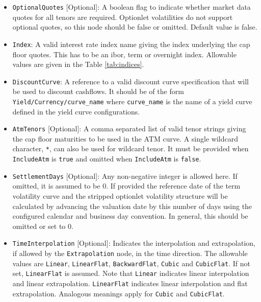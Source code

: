 \begin{itemize}
\item \lstinline!OptionalQuotes! [Optional]:
A boolean flag to indicate whether market data quotes for all tenors are required. Optionlet volatilities do not support optional quotes, so this node should be false or omitted. Default value is false.

\item \lstinline!Index!:
A valid interest rate index name giving the index underlying the cap floor quotes. This has to be an ibor, term or overnight index. Allowable values are given in the Table \ref{tab:indices}.

\item \lstinline!DiscountCurve!:
A reference to a valid discount curve specification that will be used to discount cashflows. It should be of the form \lstinline!Yield/Currency/curve_name! where \lstinline!curve_name! is the name of a yield curve defined in the yield curve configurations.

\item \lstinline!AtmTenors! [Optional]:
A comma separated list of valid tenor strings giving the cap floor maturities to be used in the ATM curve. A single wildcard character, \lstinline!*!, can also be used for wildcard tenor. It must be provided when \lstinline!IncludeAtm! is \lstinline!true! and omitted when \lstinline!IncludeAtm! is \lstinline!false!.

\item \lstinline!SettlementDays! [Optional]:
Any non-negative integer is allowed here. If omitted, it is assumed to be 0. If provided the reference date of the term volatility curve and the stripped optionlet volatility structure will be calculated by advancing the valuation date by this number of days using the configured calendar and business day convention. In general, this should be omitted or set to 0.

\item \lstinline!TimeInterpolation! [Optional]:
Indicates the interpolation and extrapolation, if allowed by the \lstinline!Extrapolation! node, in the time direction. The allowable values are \lstinline!Linear!, \lstinline!LinearFlat!, \lstinline!BackwardFlat!, \lstinline!Cubic! and \lstinline!CubicFlat!. If not set, \lstinline!LinearFlat! is assumed. Note that \lstinline!Linear! indicates linear interpolation and linear extrapolation. \lstinline!LinearFlat! indicates linear interpolation and flat extrapolation. Analogous meanings apply for \lstinline!Cubic! and \lstinline!CubicFlat!.


\end{itemize}
